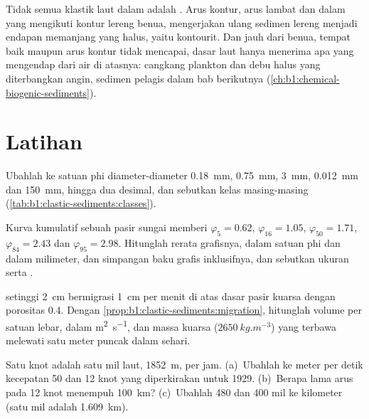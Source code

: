 Tidak semua klastik laut dalam adalah . Arus kontur, arus lambat dan dalam yang mengikuti kontur lereng benua, mengerjakan ulang sedimen lereng menjadi endapan memanjang yang halus, yaitu kontourit. Dan jauh dari benua, tempat baik  maupun arus kontur tidak mencapai, dasar laut hanya menerima apa yang mengendap dari air di atasnya: cangkang plankton dan debu halus yang diterbangkan angin, sedimen pelagis dalam bab berikutnya (\cref{ch:b1:chemical-biogenic-sediments}).

\section{Latihan}

\begin{exercise}[$\star$]\label{exo:b1:clastic-sediments:1}
Ubahlah ke satuan phi diameter-diameter \qty{0.18}{mm}, \qty{0.75}{mm},
\qty{3}{mm}, \qty{0.012}{mm} dan \qty{150}{mm}, hingga dua desimal, dan sebutkan kelas masing-masing (\cref{tab:b1:clastic-sediments:classes}).
\end{exercise}

\begin{exercise}[$\star$]\label{exo:b1:clastic-sediments:2}
Kurva kumulatif sebuah pasir sungai memberi $\varphi_5 = 0.62$, $\varphi_{16} =
1.05$, $\varphi_{50} = 1.71$, $\varphi_{84} = 2.43$ dan $\varphi_{95} = 2.98$. Hitunglah rerata grafisnya, dalam satuan phi dan dalam milimeter, dan simpangan baku grafis inklusifnya, dan sebutkan ukuran serta .
\end{exercise}

\begin{exercise}[$\star$]\label{exo:b1:clastic-sediments:3}
 setinggi \qty{2}{cm} bermigrasi \qty{1}{cm} per menit di atas dasar pasir kuarsa dengan porositas \num{0.4}. Dengan \cref{prop:b1:clastic-sediments:migration}, hitunglah volume  per satuan lebar, dalam \si{m^2.s^{-1}}, dan massa kuarsa ($\qty{2650}{kg.m^{-3}}$) yang terbawa melewati satu meter puncak dalam sehari.
\end{exercise}

\begin{exercise}[$\star$]\label{exo:b1:clastic-sediments:4}
Satu knot adalah satu mil laut, \qty{1852}{m}, per jam. (a)~Ubahlah ke meter per detik kecepatan 50 dan 12 knot yang diperkirakan untuk  1929. (b)~Berapa lama arus pada 12 knot menempuh \qty{100}{km}? (c)~Ubahlah 480 dan 400 mil ke kilometer (satu mil adalah \qty{1.609}{km}).
\end{exercise}

